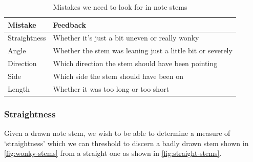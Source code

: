 \begin{table}[H]
    \renewcommand{\arraystretch}{1.6}
    \begin{tabularx}{\textwidth}{ lX }
        \toprule
        Mistake & Feedback \\
        \midrule
        Straightness & Whether it's just a bit uneven or really wonky \\
        Angle & Whether the stem was leaning just a little bit or severely \\
        Direction & Which direction the stem should have been pointing \\
        Side & Which side the stem should have been on \\
        Length & Whether it was too long or too short\\
        \bottomrule
    \end{tabularx}

    \caption{Mistakes we need to look for in note stems}
    \label{table:stem-mistakes}
\end{table}

\subsubsection{Straightness}\label{sec:scoring-stem-straightness}

Given a drawn note stem, we wish to be able to determine a measure of `straightness' which we can threshold to discern a badly drawn stem shown in \cref{fig:wonky-stems} from a straight one  as shown in \cref{fig:straight-stems}.

